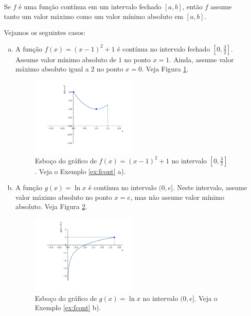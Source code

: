 \begin{teo}
  Se $f$ é uma função contínua em um intervalo fechado $[a, b]$, então $f$ assume tanto um valor máximo como um valor mínimo absoluto em $[a, b]$.
\end{teo}

\begin{ex}\label{ex:fcont}
  Vejamos os seguintes casos:
  \begin{enumerate}[a)]
  \item  A função $f(x) = (x-1)^2+1$ é contínua no intervalo fechado $[0,\frac{3}{2}]$. Assume valor mínimo absoluto de $1$ no ponto $x=1$. Ainda, assume valor máximo absoluto igual a $2$ no ponto $x=0$. Veja Figura \ref{fig:ex_fcont_f}.
  \begin{figure}[H]
    \centering
    \includegraphics[width=0.5\textwidth]{./cap_apderiv/dados/fig_ex_fcont/fig_f}
    \caption{Esboço do gráfico de $f(x) = (x-1)^2+1$ no intervalo $[0,\frac{3}{2}]$. Veja o Exemplo \ref{ex:fcont} a).}
    \label{fig:ex_fcont_f}
  \end{figure}
\item A função $g(x) = \ln x$ é contínua no intervalo $(0, e]$. Neste intervalo, assume valor máximo absoluto no ponto $x=e$, mas não assume valor mínimo absoluto. Veja Figura \ref{fig:ex_fcont_g}.
  \begin{figure}[H]
    \centering
    \includegraphics[width=0.5\textwidth]{./cap_apderiv/dados/fig_ex_fcont/fig_g}
    \caption{Esboço do gráfico de $g(x) = \ln x$ no intervalo $(0,e]$. Veja o Exemplo \ref{ex:fcont} b).}
    \label{fig:ex_fcont_g}
  \end{figure}
  

\end{enumerate}
\end{ex}
